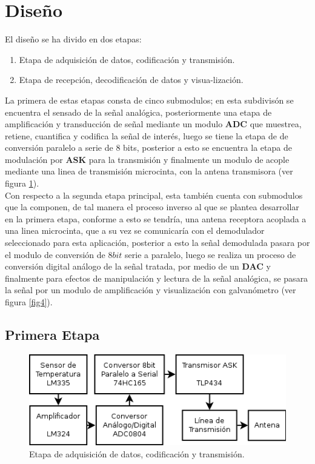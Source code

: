 \documentclass[twocolumn]{IEEEtran}
\begin{document}
\section{Diseño}
\noindent
El diseño se ha divido en dos etapas:
\begin{enumerate}
 \item Etapa de adquisición de datos, codificación y transmisión.
 \item Etapa de recepción, decodificación de datos y visua-lización.
\end{enumerate}
\noindent
La primera de estas etapas consta de cinco submodulos;  en esta subdivisón se encuentra el sensado de la señal analógica, posteriormente una etapa de amplificación y transducción de señal mediante un modulo \textbf{ADC} que muestrea, retiene, cuantifica y codifica la señal de interés, luego se tiene la etapa de de conversión  paralelo a serie de 8 bits, posterior a esto se encuentra la etapa de modulación por \textbf{ASK} para la transmisión y finalmente un modulo de acople mediante una linea de transmisión microcinta, con la antena transmisora (ver figura \ref{fig1}).\\
Con respecto a la segunda etapa principal, esta también cuenta con submodulos que la componen, de tal manera el proceso inverso al que se plantea desarrollar en la primera etapa, conforme a esto se tendría, una antena receptora acoplada a una linea microcinta, que a su vez  se comunicaría con el demodulador  seleccionado para esta aplicación,  posterior a esto la señal  demodulada pasara  por el modulo de conversión  de $8 bit$ serie a paralelo, luego se realiza  un proceso de  conversión digital análogo  de la señal tratada, por medio de un \textbf{DAC} y finalmente para efectos de manipulación y lectura de la señal analógica, se pasara la señal por un modulo de amplificación y visualización con galvanómetro (ver figura \ref{fig4}).

\subsection{Primera Etapa}

\begin{figure}[H]
	\centering
		\includegraphics[scale=0.55]{Diagrama1.png}
	\caption{Etapa de adquisición de datos, codificación y transmisión.}
	\label{fig1}
\end{figure}
\end{document}
